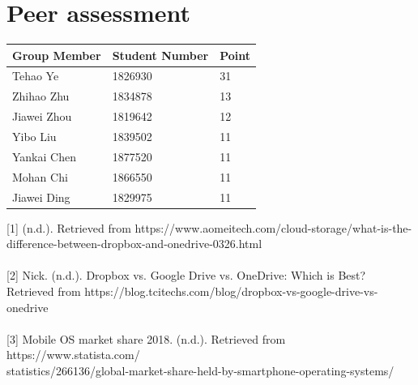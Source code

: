 \documentclass[12pt,a4]{article}
\begin{document}
\section{Peer assessment}\label{7}
\begin{table}[h]
\begin{tabular}{|l|l|l|}
\hline
Group Member & Student Number & Point \\
\hline
Tehao Ye     & 1826930        & 31    \\
\hline
Zhihao Zhu   & 1834878        & 13    \\
\hline
Jiawei Zhou  & 1819642        & 12    \\
\hline
Yibo Liu     & 1839502        & 11    \\
\hline
Yankai Chen  & 1877520        & 11    \\
\hline
Mohan Chi    & 1866550        & 11    \\
\hline
Jiawei Ding  & 1829975        & 11 \\
\hline  
\end{tabular}
\end{table}


[1] (n.d.). Retrieved from https://www.aomeitech.com/cloud-storage/what-is-the-difference-between-dropbox-and-onedrive-0326.html
\\{}\\{}
[2] Nick. (n.d.). Dropbox vs. Google Drive vs. OneDrive: Which is Best? Retrieved from https://blog.tcitechs.com/blog/dropbox-vs-google-drive-vs-onedrive
\\{}\\{}
[3] Mobile OS market share 2018. (n.d.). Retrieved from https://www.statista.com/
\\
statistics/266136/global-market-share-held-by-smartphone-operating-systems/
\end{document}
